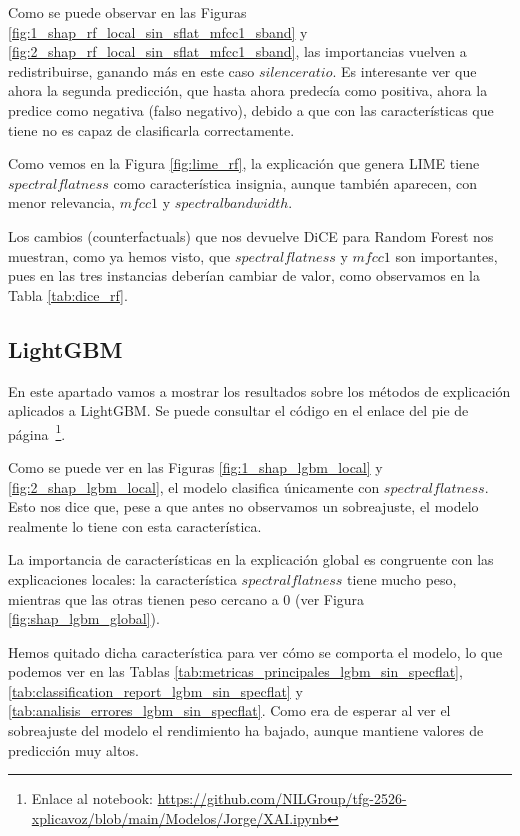 Como se puede observar en las Figuras \ref{fig:1_shap_rf_local_sin_sflat_mfcc1_sband} y \ref{fig:2_shap_rf_local_sin_sflat_mfcc1_sband}, las importancias vuelven a redistribuirse, ganando más en este caso $silence ratio$. Es interesante ver que ahora la segunda predicción, que hasta ahora predecía como positiva, ahora la predice como negativa (falso negativo), debido a que con las características que tiene no es capaz de clasificarla correctamente.

Como vemos en la Figura \ref{fig:lime_rf}, la explicación que genera LIME tiene $spectral flatness$ como característica insignia, aunque también aparecen, con menor relevancia, $mfcc 1$ y $spectral bandwidth$.

Los cambios (counterfactuals) que nos devuelve DiCE para Random Forest nos muestran, como ya hemos visto, que $spectral flatness$ y $mfcc 1$ son importantes, pues en las tres instancias deberían cambiar de valor, como observamos en la Tabla \ref{tab:dice_rf}.

\subsection{LightGBM}
\label{res_xai_lgbm}

En este apartado vamos a mostrar los resultados sobre los métodos de explicación aplicados a LightGBM. Se puede consultar el código en el enlace del pie de página~\footnote{Enlace al notebook: \url{https://github.com/NILGroup/tfg-2526-xplicavoz/blob/main/Modelos/Jorge/XAI.ipynb}}.

Como se puede ver en las Figuras \ref{fig:1_shap_lgbm_local} y \ref{fig:2_shap_lgbm_local}, el modelo clasifica únicamente con $spectral flatness$. Esto nos dice que, pese a que antes no observamos un sobreajuste, el modelo realmente lo tiene con esta característica.

La importancia de características en la explicación global es congruente con las explicaciones locales: la característica $spectral flatness$ tiene mucho peso, mientras que las otras tienen peso cercano a 0 (ver Figura \ref{fig:shap_lgbm_global}).

Hemos quitado dicha característica para ver cómo se comporta el modelo, lo que podemos ver en las Tablas \ref{tab:metricas_principales_lgbm_sin_specflat}, \ref{tab:classification_report_lgbm_sin_specflat} y \ref{tab:analisis_errores_lgbm_sin_specflat}. Como era de esperar al ver el sobreajuste del modelo el rendimiento ha bajado, aunque mantiene valores de predicción muy altos.

